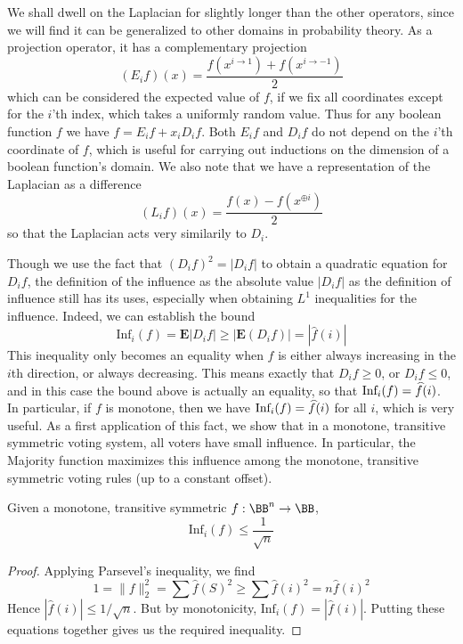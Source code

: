 We shall dwell on the Laplacian for slightly longer than the other operators, since we will find it can be generalized to other domains in probability theory. As a projection operator, it has a complementary projection
%
\[ (E_i f)(x) = \frac{f(x^{i \to 1}) + f(x^{i \to -1})}{2} \]
%
which can be considered the expected value of $f$, if we fix all coordinates except for the $i$'th index, which takes a uniformly random value. Thus for any boolean function $f$ we have $f = E_i f + x_i D_i f$. Both $E_i f$ and $D_i f$ do not depend on the $i$'th coordinate of $f$, which is useful for carrying out inductions on the dimension of a boolean function's domain. We also note that we have a representation of the Laplacian as a difference
%
\[ (L_i f)(x) = \frac{f(x) - f(x^{\oplus i})}{2} \]
%
so that the Laplacian acts very similarily to $D_i$.

Though we use the fact that $(D_if)^2 = |D_if|$ to obtain a quadratic equation for $D_i f$, the definition of the influence as the absolute value $|D_if|$ as the definition of influence still has its uses, especially when obtaining $L^1$ inequalities for the influence. Indeed, we can establish the bound
%
\[ \text{Inf}_i(f) = \mathbf{E}|D_if| \geq \left| \mathbf{E}(D_i f) \right| = | \widehat{f}(i) | \]
%
This inequality only becomes an equality when $f$ is either always increasing in the $i$th direction, or always decreasing. This means exactly that $D_i f \geq 0$, or $D_i f \leq 0$, and in this case the bound above is actually an equality, so that $\text{Inf}_i(f) = \smash{\widehat{f}}(i)$. In particular, if $f$ is monotone, then we have $\text{Inf}_i(f) = \smash{\widehat{f}(i)}$ for all $i$, which is very useful. As a first application of this fact, we show that in a monotone, transitive symmetric voting system, all voters have small influence. In particular, the Majority function maximizes this influence among the monotone, transitive symmetric voting rules (up to a constant offset).

\begin{theorem}
    Given a monotone, transitive symmetric $f: \BB^n \to \BB$,
    \[ \text{Inf}_i(f) \leq \frac{1}{\sqrt{n}} \]
\end{theorem}
\begin{proof}
    Applying Parsevel's inequality, we find
    \[ 1 = \| f \|_2^2 = \sum \widehat{f}(S)^2 \geq \sum \widehat{f}(i)^2 = n \widehat{f}(i)^2 \]
    Hence $|\widehat{f}(i)| \leq 1/\sqrt{n}$. But by monotonicity, $\text{Inf}_i(f) = |\widehat{f}(i)|$. Putting these equations together gives us the required inequality.
\end{proof}

